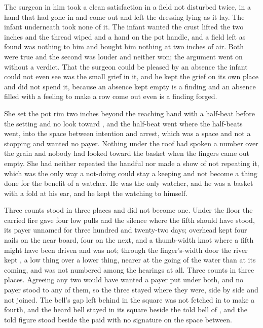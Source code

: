 The surgeon in him took a clean satisfaction in a field not disturbed twice, in a hand that had gone in and come out and left the dressing lying as it lay. The infant underneath took none of it. The infant wanted the crust lifted the two inches and the thread wiped and a hand on the pot handle, and a field left as found was nothing to him and bought him nothing at two inches of air. Both were true and the second was louder and neither won; the argument went on without a verdict. That the surgeon could be pleased by an absence the infant could not even see was the small grief in it, and he kept the grief on its own place and did not spend it, because an absence kept empty is a finding and an absence filled with a feeling to make a row come out even is a finding forged.

She set the pot rim two inches beyond the reaching hand with a half-beat before the setting and no look toward , and the half-beat went where the half-beats went, into the space between intention and arrest, which was a space and not a stopping and wanted no payer. Nothing under the roof had spoken a number over the grain and nobody had looked toward the basket when the fingers came out empty. She had neither repeated the handful nor made a show of not repeating it, which was the only way a not-doing could stay a keeping and not become a thing done for the benefit of a watcher. He was the only watcher, and he was a basket with a fold at his ear, and he kept the watching to himself.

\scenebreak

Three counts stood in three places and did not become one. Under the floor the carried fire gave four low pulls and the silence where the fifth should have stood, its payer unnamed for three hundred and twenty-two days; overhead  kept four nails on the near board, four on the next, and a thumb-width knot where a fifth might have been driven and was not; through the finger's-width door the river kept , a low thing over a lower thing, nearer at the going of the water than at its coming, and was not numbered among the hearings at all. Three counts in three places. Agreeing any two would have wanted a payer put under both, and no payer stood to any of them, so the three stayed where they were, side by side and not joined. The bell's gap left behind in the square was not fetched in to make a fourth, and the heard bell stayed in its square beside the told bell of , and the told figure stood beside the paid with no signature on the space between.

